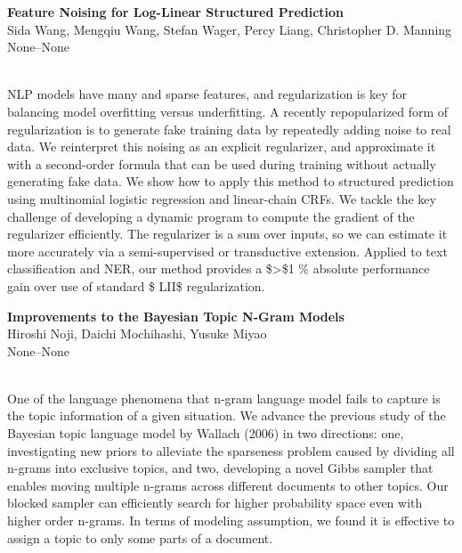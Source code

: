 \documentclass[twoside,makeidx]{book}
\renewcommand{\normalsize}{\fontsize{8}{9}\selectfont}
\renewcommand{\small}{\fontsize{7}{8}\selectfont}
\begin{document}
\par\vspace{2em}\noindent%
\begin{minipage}{\linewidth}%
\begin{center}
\textbf{\normalsize Feature Noising for Log-Linear Structured Prediction}\\
\normalsize  Sida Wang,  Mengqiu Wang,  Stefan Wager,  Percy Liang,  Christopher D. Manning\\
{\small None--None}\\
\end{center}
\end{minipage}\\[0.5em]
\nopagebreak%
\noindent%
{\small NLP models have many and sparse features, and regularization is key for balancing model overfitting versus underfitting. A recently repopularized form of regularization is to generate fake training data by repeatedly adding noise to real data. We reinterpret this noising as an explicit regularizer, and approximate it with a second-order formula that can be used during training without actually generating fake data. We show how to apply this method to structured prediction using multinomial logistic regression and linear-chain CRFs. We tackle the key challenge of developing a dynamic program to compute the gradient of the regularizer efficiently. The regularizer is a sum over inputs, so we can estimate it more accurately via a semi-supervised or transductive extension. Applied to text classification and NER, our method provides a \$>\$1 \% absolute performance gain over use of standard \$ LII\$ regularization.}
\par\vspace{2em}\noindent%
\begin{minipage}{\linewidth}%
\begin{center}
\textbf{\normalsize Improvements to the Bayesian Topic N-Gram Models}\\
\normalsize  Hiroshi Noji,  Daichi Mochihashi,  Yusuke Miyao\\
{\small None--None}\\
\end{center}
\end{minipage}\\[0.5em]
\nopagebreak%
\noindent%
{\small One of the language phenomena that n-gram language model fails to capture is the topic information of a given situation. We advance the previous study of the Bayesian topic language model by Wallach (2006) in two directions: one, investigating new priors to alleviate the sparseness problem caused by dividing all n-grams into exclusive topics, and two, developing a novel Gibbs sampler that enables moving multiple n-grams across different documents to other topics. Our blocked sampler can efficiently search for higher probability space even with higher order n-grams. In terms of modeling assumption, we found it is effective to assign a topic to only some parts of a document.}
\end{document}
